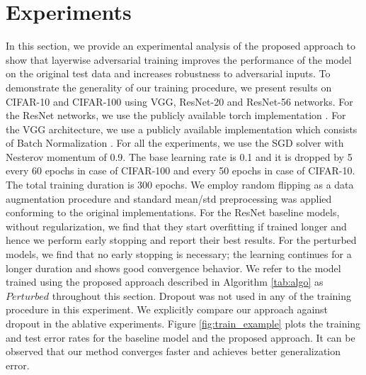 \documentclass[letterpaper]{article} %
\begin{document}
\section{Experiments}
In this section, we provide an experimental analysis of the proposed approach to show that layerwise adversarial training improves the performance of the model on the original test data and increases robustness to adversarial inputs. To demonstrate the generality of our training procedure, we present results on CIFAR-10 and CIFAR-100 \cite{krizhevsky2009learning} using VGG, ResNet-20 and ResNet-56 networks. For the ResNet networks, we use the publicly available torch implementation \cite{ResNetTorch}. For the VGG architecture, we use a publicly available implementation which consists of Batch Normalization \cite{VGGTorch}. For all the experiments, we use the SGD solver with Nesterov momentum of 0.9. The base learning rate is 0.1 and it is dropped by 5 every 60 epochs in case of CIFAR-100 and every 50 epochs in case of CIFAR-10. The total training duration is 300 epochs. We employ random flipping as a data augmentation procedure and standard mean/std preprocessing was applied conforming to the original implementations. For the ResNet baseline models, without regularization, we find that they start overfitting if trained longer and hence we perform early stopping and report their best results. For the perturbed models, we find that no early stopping is necessary; the learning continues for a longer duration and shows good convergence behavior.  We refer to the model trained using the proposed approach described in Algorithm \ref{tab:algo} as $Perturbed$ throughout this section. Dropout was not used in any of the training procedure in this experiment. We explicitly compare our approach against dropout in the ablative experiments. Figure \ref{fig:train_example} plots the training and test error rates for the baseline model and the proposed approach. It can be observed that our method converges faster and achieves better generalization error. 
\end{document}
